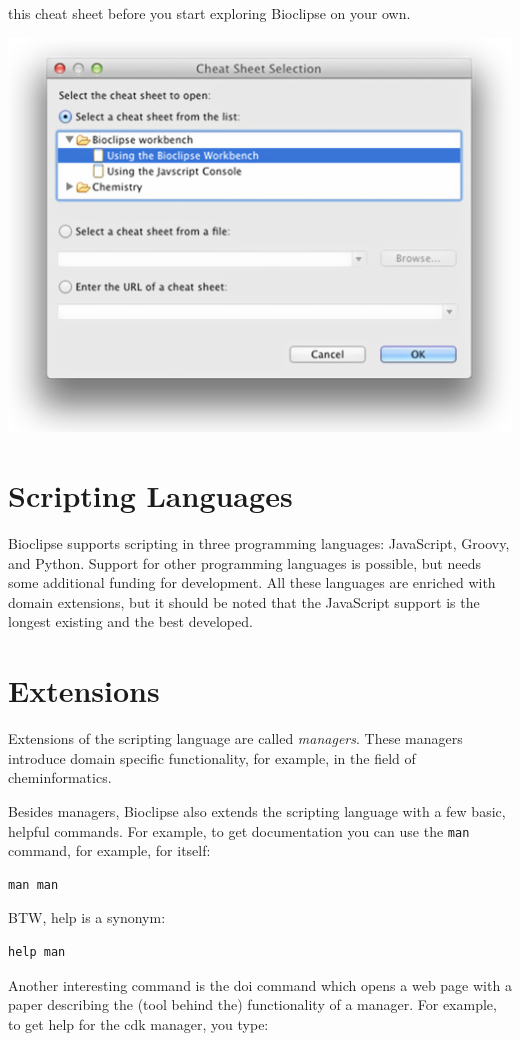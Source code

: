 \documentclass[a5paper, 10pt]{memoir}
\begin{document}
\begin{refsection}
this cheat sheet before you start exploring Bioclipse on your own.
\begin{center}
\includegraphics[width=1\textwidth]{images/cheatSheet.png}
\end{center}


\section{Scripting Languages}

Bioclipse supports scripting in three programming languages:
JavaScript, Groovy, and Python.
Support for other programming languages is possible, but needs some additional
funding for development. All these languages are enriched with domain
extensions, but it should be noted that the JavaScript support is the
longest existing and the best developed.

\section{Extensions}

Extensions of the scripting language are called \emph{managers}.
These managers introduce domain specific functionality, for
example, in the field of cheminformatics.

Besides managers, Bioclipse also extends the scripting language with a few
basic, helpful commands. For example, to get documentation you can use the
\texttt{man} command, for example, for itself:
\begin{Verbatim}
man man
\end{Verbatim}
BTW, help is a synonym:
\begin{Verbatim}
help man
\end{Verbatim}
Another interesting command is the doi command which opens a web page with a
paper describing the (tool behind the) functionality of a manager. For example,
to get help for the cdk manager, you type:


\end{refsection}
\end{document}
